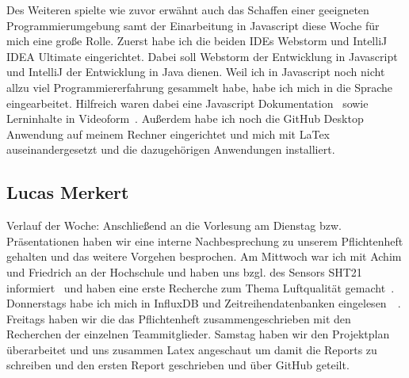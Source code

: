 \documentclass[]{article}
\begin{document}
Des Weiteren spielte wie zuvor erwähnt auch das Schaffen einer geeigneten Programmierumgebung samt der Einarbeitung in Javascript diese Woche für mich eine große Rolle. Zuerst habe ich die beiden IDEs Webstorm und IntelliJ IDEA Ultimate eingerichtet. Dabei soll Webstorm der Entwicklung in Javascript und IntelliJ der Entwicklung in Java dienen. Weil ich in Javascript noch nicht allzu viel Programmiererfahrung gesammelt habe, habe ich mich in die Sprache eingearbeitet. Hilfreich waren dabei eine Javascript Dokumentation~\cite{JS_docu} sowie Lerninhalte in Videoform~\cite{javascript_tut}. Außerdem habe ich noch die GitHub Desktop Anwendung auf meinem Rechner eingerichtet und mich mit LaTex auseinandergesetzt und die dazugehörigen Anwendungen installiert.

\subsection{Lucas Merkert}
Verlauf der Woche: Anschließend an die Vorlesung am Dienstag bzw. Präsentationen haben wir eine interne Nachbesprechung zu unserem Pflichtenheft gehalten und das weitere Vorgehen besprochen. Am Mittwoch war ich mit Achim und Friedrich an der Hochschule und haben uns bzgl. des Sensors SHT21 informiert~\cite{datasheetsht21} und haben eine erste Recherche zum Thema Luftqualität gemacht~\cite{co2letter}. Donnerstags habe ich mich in InfluxDB und Zeitreihendatenbanken eingelesen~\cite{influxdb_sql_db}~\cite{youtube_timeseriesdatabase}. Freitags haben wir die das Pflichtenheft zusammengeschrieben mit den Recherchen der einzelnen Teammitglieder. Samstag haben wir den Projektplan überarbeitet und uns zusammen Latex angeschaut um damit die Reports zu schreiben und den ersten Report geschrieben und über GitHub geteilt.
\end{document}
